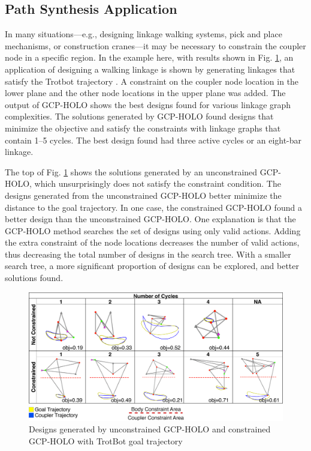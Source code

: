 \subsection{Path Synthesis Application}\label{sec:gcp:results:synthesis}
In many situations—e.g., designing linkage walking systems, pick and place mechanisms, or construction cranes—it may be necessary to constrain the coupler node in a specific region. In the example here, with results shown in Fig. \ref{fig:constrained-gcp}, an application of designing a walking linkage is shown by generating linkages that satisfy the Trotbot trajectory \cite{Vagle2015TeamTrotbot}. A constraint on the coupler node location in the lower plane and the other node locations in the upper plane was added. The output of GCP-HOLO shows the best designs found for various linkage graph complexities. The solutions generated by GCP-HOLO found designs that minimize the objective and satisfy the constraints with linkage graphs that contain 1–5 cycles. The best design found had three active cycles or an eight-bar linkage.

The top of Fig. \ref{fig:constrained-gcp} shows the solutions generated by an unconstrained GCP-HOLO, which unsurprisingly does not satisfy the constraint condition. The designs generated from the unconstrained GCP-HOLO better minimize the distance to the goal trajectory. In one case, the constrained GCP-HOLO found a better design than the unconstrained GCP-HOLO. One explanation is that the GCP-HOLO method searches the set of designs using only valid actions. Adding the extra constraint of the node locations decreases the number of valid actions, thus decreasing the total number of designs in the search tree. With a smaller search tree, a more significant proportion of designs can be explored, and better solutions found.

\begin{figure}
    \centering
    \includegraphics[width=0.9\linewidth]{10_figure_Constraint_example.png}
    \caption{Designs generated by unconstrained GCP-HOLO and constrained GCP-HOLO with TrotBot goal trajectory}
    \label{fig:constrained-gcp}
\end{figure}

